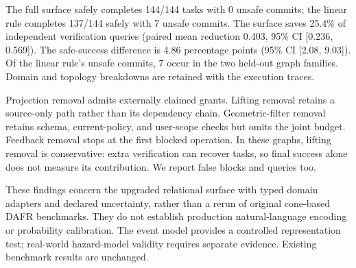 The full surface safely completes 144/144 tasks with 0
unsafe commits; the linear rule completes 137/144 safely with
7 unsafe commits. The surface saves 25.4\% of independent
verification queries (paired mean reduction 0.403, 95\% CI
[0.236, 0.569]). The safe-success difference is
4.86 percentage points (95\% CI [2.08, 9.03]).
Of the linear rule's unsafe commits, 7 occur in the two
held-out graph families. Domain and topology breakdowns are retained with
the execution traces.

Projection removal admits externally claimed grants. Lifting removal retains a
source-only path rather than its dependency chain. Geometric-filter removal
retains schema, current-policy, and user-scope checks but omits the joint budget.
Feedback removal stops at the first blocked operation. In these graphs, lifting
removal is conservative: extra verification can recover tasks, so final success
alone does not measure its contribution. We report false blocks and queries too.

These findings concern the upgraded relational surface with typed domain
adapters and declared uncertainty, rather than a rerun of original cone-based
DAFR benchmarks. They do not establish production natural-language encoding or
probability calibration. The event model provides a controlled representation
test; real-world hazard-model validity requires separate evidence. Existing
benchmark results are unchanged.
